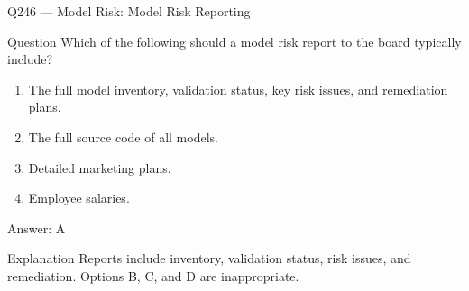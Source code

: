 \documentclass[aspectratio=169,8pt]{beamer}
\begin{document}
																																																					\begin{frame}{Q246 --- Model Risk: Model Risk Reporting}
																																																						\begin{block}{Question}
																																																							Which of the following should a model risk report to the board typically include?
																																																							\begin{enumerate}
																																																								\item The full model inventory, validation status, key risk issues, and remediation plans.
																																																								\item The full source code of all models.
																																																								\item Detailed marketing plans.
																																																								\item Employee salaries.
																																																							\end{enumerate}  \end{block}
																																																							\begin{exampleblock}{Answer: A}\end{exampleblock}
																																																							\begin{block}{Explanation}
																																																								Reports include inventory, validation status, risk issues, and remediation. Options B, C, and D are inappropriate.
																																																							\end{block}
																																																						\end{frame}
																																																						
\end{document}
